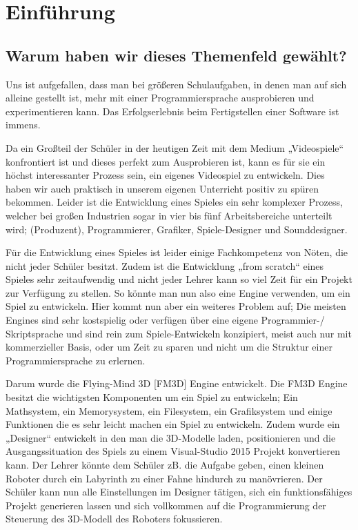
\chapter{Einführung}
\label{c:einführung}
\setcounter{page}{1}
\section[Warum dieses Themenfeld?]{Warum haben wir dieses Themenfeld gewählt?}

Uns ist aufgefallen, dass man bei größeren Schulaufgaben, in denen man auf sich alleine gestellt ist, mehr mit einer Programmiersprache ausprobieren und experimentieren kann. Das Erfolgserlebnis beim Fertigstellen einer Software ist immens. 

Da ein Großteil der Schüler in der heutigen Zeit mit dem Medium „Videospiele“ konfrontiert ist und dieses perfekt zum Ausprobieren ist, kann es für sie ein höchst interessanter Prozess sein, ein eigenes Videospiel zu entwickeln. Dies haben wir auch praktisch in unserem eigenen Unterricht positiv zu spüren bekommen.
Leider ist die Entwicklung eines Spieles ein sehr komplexer Prozess, welcher bei großen Industrien sogar in vier bis fünf Arbeitsbereiche unterteilt wird; (Produzent), Programmierer, Grafiker, Spiele-Designer und Sounddesigner.  \cite{gea}

Für die Entwicklung eines Spieles ist leider einige Fachkompetenz von Nöten, die nicht jeder Schüler besitzt. Zudem ist die Entwicklung „from scratch“ eines Spieles sehr zeitaufwendig und nicht jeder Lehrer kann so viel Zeit für ein Projekt zur Verfügung zu stellen. 
So könnte man nun also eine Engine verwenden, um ein Spiel zu entwickeln. Hier kommt nun aber ein weiteres Problem auf; Die meisten Engines sind sehr kostspielig oder verfügen über eine eigene Programmier-/ Skriptsprache und sind rein zum Spiele-Entwickeln konzipiert, meist auch nur mit kommerzieller Basis, oder um Zeit zu sparen und nicht um die Struktur einer Programmiersprache zu erlernen.

Darum wurde die Flying-Mind 3D [FM3D] Engine entwickelt. Die FM3D Engine besitzt die wichtigsten Komponenten um ein Spiel zu entwickeln;  Ein Mathsystem, ein Memorysystem, ein Filesystem, ein Grafiksystem und einige Funktionen die es sehr leicht machen ein Spiel zu entwickeln.
Zudem wurde ein „Designer“ entwickelt in den man die 3D-Modelle laden, positionieren und die Ausgangssituation des Spiels zu einem Visual-Studio 2015 Projekt konvertieren kann.
Der Lehrer könnte dem Schüler zB. die Aufgabe geben, einen kleinen Roboter durch ein Labyrinth zu einer Fahne hindurch zu manövrieren. Der Schüler kann nun alle Einstellungen im Designer tätigen, sich ein funktionsfähiges Projekt generieren lassen und sich vollkommen auf die Programmierung der Steuerung des 3D-Modell des Roboters fokussieren.

